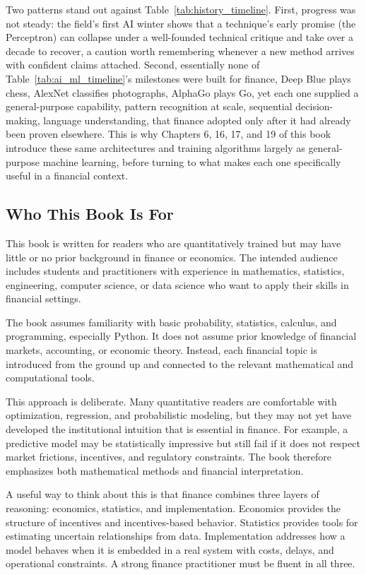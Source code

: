 \documentclass[../ai_in_finance]{subfiles}
\begin{document}
Two patterns stand out against Table~\ref{tab:history_timeline}. First, progress was not steady: the field's first AI winter shows that a technique's early promise (the Perceptron) can collapse under a well-founded technical critique and take over a decade to recover, a caution worth remembering whenever a new method arrives with confident claims attached.
Second, essentially none of Table~\ref{tab:ai_ml_timeline}'s milestones were built for finance, Deep Blue plays chess, AlexNet classifies photographs, AlphaGo plays Go, yet each one supplied a general-purpose capability, pattern recognition at scale, sequential decision-making, language understanding, that finance adopted only after it had already been proven elsewhere. This is why Chapters 6, 16, 17, and 19 of this book introduce these same architectures and training algorithms largely as general-purpose machine learning, before turning to what makes each one specifically useful in a financial context.

\subsection{Who This Book Is For}

This book is written for readers who are quantitatively trained but may have little or no prior background in finance or economics. The intended audience includes students and practitioners with experience in mathematics, statistics, engineering, computer science, or data science who want to apply their skills in financial settings.

The book assumes familiarity with basic probability, statistics, calculus, and programming, especially Python. It does not assume prior knowledge of financial markets, accounting, or economic theory. Instead, each financial topic is introduced from the ground up and connected to the relevant mathematical and computational tools.

This approach is deliberate. Many quantitative readers are comfortable with optimization, regression, and probabilistic modeling, but they may not yet have developed the institutional intuition that is essential in finance. For example, a predictive model may be statistically impressive but still fail if it does not respect market frictions, incentives, and regulatory constraints. The book therefore emphasizes both mathematical methods and financial interpretation.

A useful way to think about this is that finance combines three layers of reasoning: economics, statistics, and implementation. Economics provides the structure of incentives and incentives-based behavior. Statistics provides tools for estimating uncertain relationships from data. Implementation addresses how a model behaves when it is embedded in a real system with costs, delays, and operational constraints. A strong finance practitioner must be fluent in all three.
\end{document}
